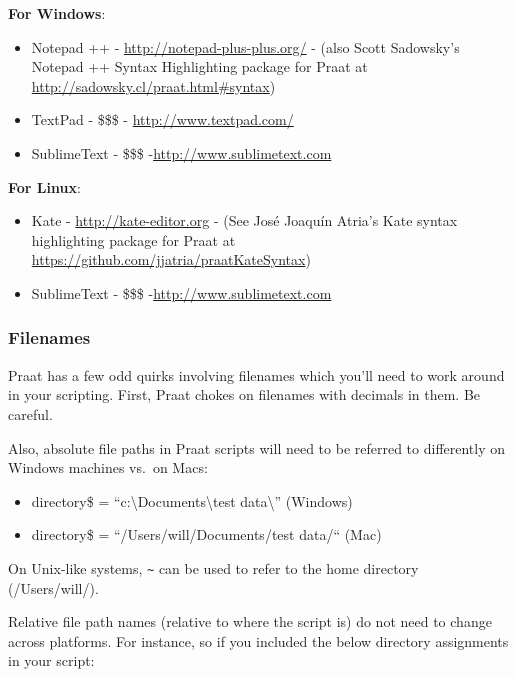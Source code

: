 \textbf{For Windows}:

\begin{itemize}
\tightlist
\item
  Notepad ++ - \url{http://notepad-plus-plus.org/} - (also Scott
  Sadowsky's Notepad ++ Syntax Highlighting package for Praat at
  \url{http://sadowsky.cl/praat.html#syntax})
\item
  TextPad - \$\$\$ - \url{http://www.textpad.com/}
\item
  SublimeText - \$\$\$ -\url{http://www.sublimetext.com}
\end{itemize}

\textbf{For Linux}:

\begin{itemize}
\tightlist
\item
  Kate - \url{http://kate-editor.org} - (See José Joaquín Atria's Kate
  syntax highlighting package for Praat at
  \url{https://github.com/jjatria/praatKateSyntax})
\item
  SublimeText - \$\$\$ -\url{http://www.sublimetext.com}
\end{itemize}

\hypertarget{filenames}{%
\subsubsection{Filenames}\label{filenames}}

\label{filenames}

Praat has a few odd quirks involving filenames which you'll need to work
around in your scripting. First, Praat chokes on filenames with decimals
in them. Be careful.

Also, absolute file paths in Praat scripts will need to be referred to
differently on Windows machines vs.~on Macs:

\begin{itemize}
\tightlist
\item
  directory\$ = ``c:\textbackslash Documents\textbackslash test
  data\textbackslash'' (Windows)
\item
  directory\$ = ``/Users/will/Documents/test data/`` (Mac)
\end{itemize}

On Unix-like systems, \texttt{\~} can be used to refer to the home
directory (/Users/will/).

Relative file path names (relative to where the script is) do not need
to change across platforms. For instance, so if you included the below
directory assignments in your script:

